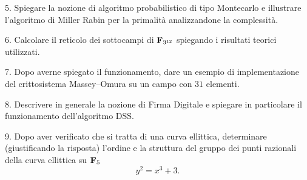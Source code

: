 \item{5.} Spiegare la nozione di algoritmo probabilistico di tipo Montecarlo e illustrare l'algoritmo di Miller Rabin per
la primalit\`a analizzandone
la complessit\`a.
\ve\vs

\item{6.} Calcolare il reticolo dei sottocampi di ${\bf F}_{3^{12}}$ spiegando i risultati teorici utilizzati.
\vv

\item{7.} Dopo averne spiegato il funzionamento, dare un esempio di implementazione del crittosistema Massey--Omura su un campo con $31$ elementi.
\ve \vs

\item{8.} Descrivere in generale la nozione di Firma Digitale e spiegare in particolare il funzionamento dell'algoritmo DSS.
\vv

\item{9.} Dopo aver verificato che si tratta di una curva ellittica, determinare (giustificando la risposta) l'ordine e la struttura del gruppo
dei punti razionali della curva ellittica su ${\bf F}_5$
$$y^2 = x^3 + 3.$$
\ \vst

 \bye
